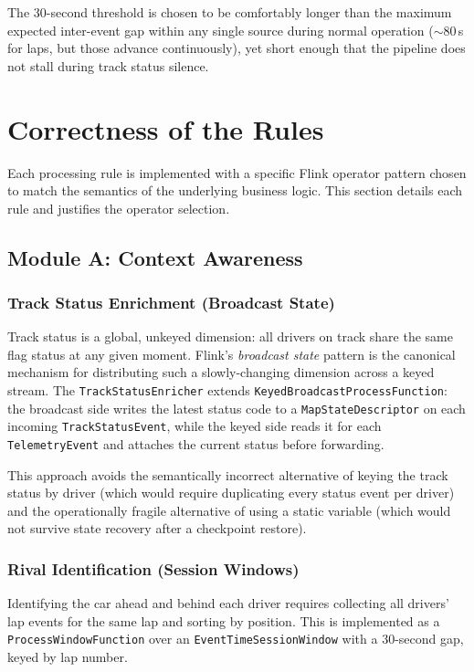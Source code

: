 \documentclass[a4paper,twocolumn]{article}
\begin{document}
The 30-second threshold is chosen to be comfortably longer than the
maximum expected inter-event gap within any single source during normal
operation ($\sim$80\,s for laps, but those advance continuously), yet
short enough that the pipeline does not stall during track status silence.

\section{Correctness of the Rules}

Each processing rule is implemented with a specific Flink operator pattern
chosen to match the semantics of the underlying business logic. This
section details each rule and justifies the operator selection.

\subsection{Module A: Context Awareness}

\subsubsection{Track Status Enrichment (Broadcast State)}

Track status is a global, unkeyed dimension: all drivers on track share
the same flag status at any given moment. Flink's \emph{broadcast state}
pattern is the canonical mechanism for distributing such a slowly-changing
dimension across a keyed stream. The \texttt{TrackStatusEnricher} extends
\texttt{KeyedBroadcastProcessFunction}: the broadcast side writes the
latest status code to a \texttt{MapStateDescriptor} on each incoming
\texttt{TrackStatusEvent}, while the keyed side reads it for each
\texttt{TelemetryEvent} and attaches the current status before forwarding.

This approach avoids the semantically incorrect alternative of keying the
track status by driver (which would require duplicating every status event
per driver) and the operationally fragile alternative of using a static
variable (which would not survive state recovery after a checkpoint
restore).

\subsubsection{Rival Identification (Session Windows)}

Identifying the car ahead and behind each driver requires collecting all
drivers' lap events for the same lap and sorting by position. This is
implemented as a \texttt{ProcessWindowFunction} over an
\texttt{EventTimeSessionWindow} with a 30-second gap, keyed by lap
number.
\end{document}
